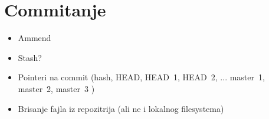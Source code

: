\chapter*{Commitanje}

\begin{itemize}
   \item Ammend
   \item Stash?
   \item Pointeri na commit (hash, HEAD, HEAD~1, HEAD~2, ... master~1, master~2, master~3 )
   \item Brisanje fajla iz repozitrija (ali ne i lokalnog filesystema)
\end{itemize}


